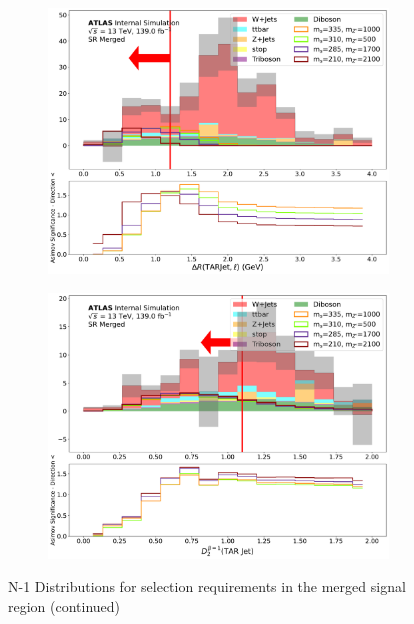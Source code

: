  \begin{figure} \ContinuedFloat
    \begin{subfigure}[t]{0.48\textwidth}
    \centering
     \includegraphics[width = 0.99\textwidth]{Figures/5/SR1L_Merged/dR_lep_TARJets10_N_1.pdf}
    \caption{\drTARl}
    \end{subfigure}
    \begin{subfigure}[t]{0.48\textwidth}
    \centering
     \includegraphics[width = 0.99\textwidth]{Figures/5/SR1L_Merged/TARJets10_TAR_D20_N_1.pdf}
    \caption{\DtwoTAR}
    \end{subfigure}
    \caption{N-1 Distributions for selection requirements in the merged signal region (continued)}
  \end{figure}
  

